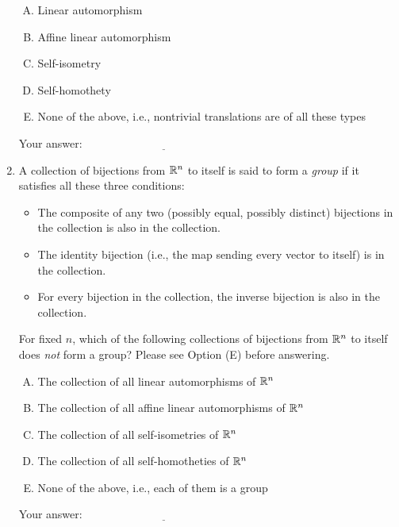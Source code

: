 \documentclass[10pt]{amsart}
\begin{document}
\begin{enumerate}
  \begin{enumerate}[(A)]
  \item Linear automorphism
  \item Affine linear automorphism
  \item Self-isometry
  \item Self-homothety
  \item None of the above, i.e., nontrivial translations are of all
    these types
  \end{enumerate}

  \vspace{0.1in}
  Your answer: $\underline{\qquad\qquad\qquad\qquad\qquad\qquad\qquad}$
  \vspace{0.1in}

\item A collection of bijections from $\mathbb{R}^n$ to itself is said to form
  a {\em group} if it satisfies all these three conditions:

  \begin{itemize}
  \item The composite of any two (possibly equal, possibly distinct)
    bijections in the collection is also in the collection.
  \item The identity bijection (i.e., the map sending every vector to
    itself) is in the collection.
  \item For every bijection in the collection, the inverse bijection is
    also in the collection.
  \end{itemize}

  For fixed $n$, which of the following collections of bijections from
  $\mathbb{R}^n$ to itself does {\em not} form a group? Please see Option (E)
  before answering.

  \begin{enumerate}[(A)]
  \item The collection of all linear automorphisms of $\mathbb{R}^n$
  \item The collection of all affine linear automorphisms of $\mathbb{R}^n$
  \item The collection of all self-isometries of $\mathbb{R}^n$
  \item The collection of all self-homotheties of $\mathbb{R}^n$
  \item None of the above, i.e., each of them is a group
  \end{enumerate}

  \vspace{0.1in}
  Your answer: $\underline{\qquad\qquad\qquad\qquad\qquad\qquad\qquad}$
  \vspace{0.1in}



\end{enumerate}
\end{document}
